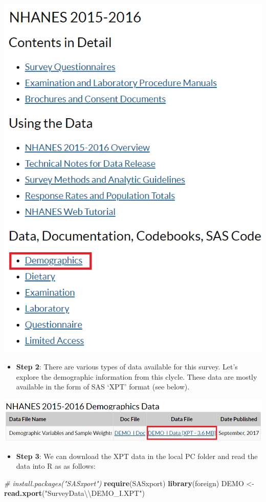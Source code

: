 \documentclass[
]{book}
\newenvironment{Shaded}{\begin{snugshade}}{\end{snugshade}}
\newcommand{\CharTok}[1]{\textcolor[rgb]{0.31,0.60,0.02}{#1}}
\newcommand{\CommentTok}[1]{\textcolor[rgb]{0.56,0.35,0.01}{\textit{#1}}}
\newcommand{\KeywordTok}[1]{\textcolor[rgb]{0.13,0.29,0.53}{\textbf{#1}}}
\newcommand{\NormalTok}[1]{#1}
\newcommand{\StringTok}[1]{\textcolor[rgb]{0.31,0.60,0.02}{#1}}
\providecommand{\tightlist}{%
  \setlength{\itemsep}{0pt}\setlength{\parskip}{0pt}}
\begin{document}
\includegraphics[width=0.65\linewidth]{images/n15demo}

\begin{itemize}
\tightlist
\item
  \textbf{Step 2}: There are various types of data available for this survey. Let's explore the demographic information from this clycle. These data are mostly available in the form of SAS `XPT' format (see below).
\end{itemize}

\includegraphics[width=0.65\linewidth]{images/xptsasdata}

\begin{itemize}
\tightlist
\item
  \textbf{Step 3}: We can download the XPT data in the local PC folder and read the data into R as as follows:
\end{itemize}

\begin{Shaded}
\begin{Highlighting}[]
\CommentTok{# install.packages("SASxport")}
\KeywordTok{require}\NormalTok{(SASxport)}
\KeywordTok{library}\NormalTok{(foreign)}
\NormalTok{DEMO <-}\StringTok{ }\KeywordTok{read.xport}\NormalTok{(}\StringTok{"SurveyData}\CharTok{\textbackslash{}\textbackslash{}}\StringTok{DEMO_I.XPT"}\NormalTok{)}
\end{Highlighting}
\end{Shaded}
\end{document}
